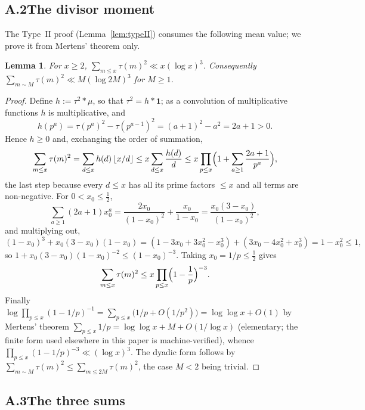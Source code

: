 \documentclass[11pt]{article}
\newtheorem{lemma}[theorem]{Lemma}
\theoremstyle{definition}
\theoremstyle{plain}
\newcommand{\fl}[1]{\left\lfloor #1\right\rfloor}
\begin{document}
\subsection*{A.2\quad The divisor moment}

The Type~II proof (Lemma~\ref{lem:typeII}) consumes the following mean
value; we prove it from Mertens' theorem only.

\begin{lemma}\label{lem:tau2}
For $x\ge2$, $\sum_{m\le x}\tau(m)^{2}\ll x(\log x)^{3}$.
Consequently $\sum_{m\sim M}\tau(m)^{2}\ll M(\log 2M)^{3}$ for $M\ge1$.
\end{lemma}

\begin{proof}
Define $h:=\tau^{2}*\mu$, so that $\tau^{2}=h*\mathbf 1$; as a
convolution of multiplicative functions $h$ is multiplicative, and
\[
h(p^{a})=\tau(p^{a})^{2}-\tau(p^{a-1})^{2}=(a+1)^{2}-a^{2}=2a+1>0 .
\]
Hence $h\ge0$ and, exchanging the order of summation,
\[
\sum_{m\le x}\tau(m)^{2}=\sum_{d\le x}h(d)\fl{x/d}
\le x\sum_{d\le x}\frac{h(d)}{d}
\le x\prod_{p\le x}\Bigl(1+\sum_{a\ge1}\frac{2a+1}{p^{a}}\Bigr),
\]
the last step because every $d\le x$ has all its prime factors $\le x$ and
all terms are non-negative.  For $0<x_{0}\le\tfrac12$,
\[
\sum_{a\ge1}(2a+1)x_{0}^{a}
=\frac{2x_{0}}{(1-x_{0})^{2}}+\frac{x_{0}}{1-x_{0}}
=\frac{x_{0}(3-x_{0})}{(1-x_{0})^{2}} ,
\]
and multiplying out,
\[
(1-x_{0})^{3}+x_{0}(3-x_{0})(1-x_{0})
=(1-3x_{0}+3x_{0}^{2}-x_{0}^{3})+(3x_{0}-4x_{0}^{2}+x_{0}^{3})
=1-x_{0}^{2}\le1 ,
\]
so $1+x_{0}(3-x_{0})(1-x_{0})^{-2}\le(1-x_{0})^{-3}$.  Taking
$x_{0}=1/p\le\tfrac12$ gives
\[
\sum_{m\le x}\tau(m)^{2}\le x\prod_{p\le x}\Bigl(1-\frac1p\Bigr)^{-3}.
\]
Finally $\log\prod_{p\le x}(1-1/p)^{-1}
=\sum_{p\le x}\bigl(1/p+O(1/p^{2})\bigr)=\log\log x+O(1)$ by Mertens'
theorem $\sum_{p\le x}1/p=\log\log x+M+O(1/\log x)$ (elementary; the
finite form used elsewhere in this paper is machine-verified), whence
$\prod_{p\le x}(1-1/p)^{-3}\ll(\log x)^{3}$.  The dyadic form follows by
$\sum_{m\sim M}\tau(m)^{2}\le\sum_{m\le 2M}\tau(m)^{2}$, the case
$M<2$ being trivial.
\end{proof}

\subsection*{A.3\quad The three sums}
\end{document}
